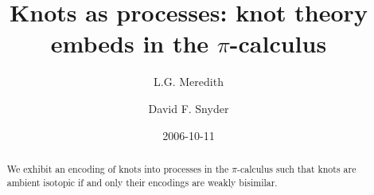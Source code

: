 \title{Knots as processes: knot theory embeds in the $\pi$-calculus}

\author{ L.G. Meredith} 
\address{ Biosimilarity LLC\\ 505 N72nd St, Seattle, WA 98103, USA}
\author{David F. Snyder}    
\address{Department of Mathematics\\ Texas State
University--San Marcos\\ 601 University Drive \\
San Marcos, TX 78666}


\date{2006-10-11}  

\maketitle              %


\begin{abstract}

          We exhibit an encoding of knots into processes in the
          $\pi$-calculus such that knots are ambient isotopic if and
          only their encodings are weakly bisimilar. 

\end{abstract}


